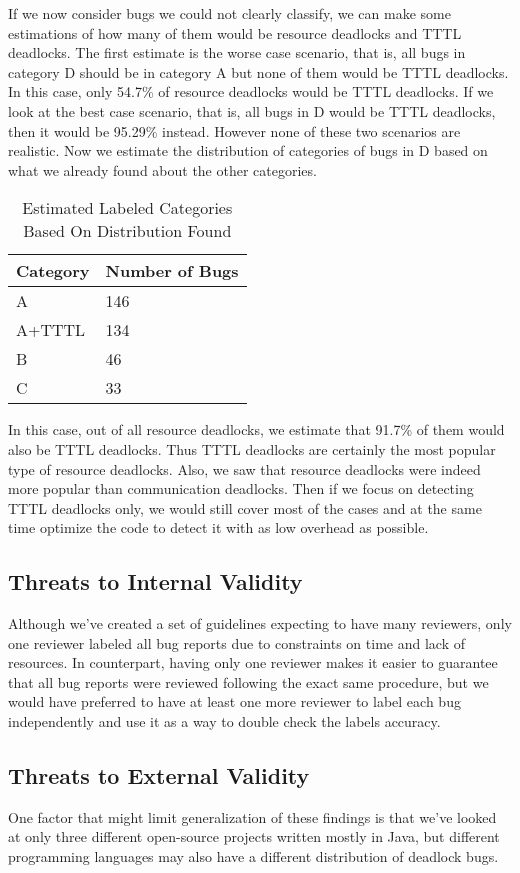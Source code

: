 If we now consider bugs we could not clearly classify, we can make some estimations of how many of them would be resource deadlocks and TTTL deadlocks.
The first estimate is the worse case scenario, that is, all bugs in category D should be in category A but none of them would be TTTL deadlocks. In this case, only 54.7\% of resource deadlocks would be TTTL deadlocks. If we look at the best case scenario, that is, all bugs in D would be TTTL deadlocks, then it would be 95.29\% instead. However none of these two scenarios are realistic. Now we estimate the distribution of categories of bugs in D based on what we already found about the other categories.

\begin{table}
\begin{center}
\caption{Estimated Labeled Categories Based On Distribution Found}
\begin{tabular}{|l|l|}
\hline
Category & Number of Bugs \\
\hline
A & 146 \\  
A+TTTL &  134 \\
B & 46 \\
C & 33 \\
\hline
\end{tabular}
\end{center}
\end{table}

In this case, out of all resource deadlocks, we estimate that 91.7\% of them would also be TTTL deadlocks. Thus TTTL deadlocks are certainly the most popular type of resource deadlocks. Also, we saw that resource deadlocks were indeed more popular than communication deadlocks. Then if we focus on detecting TTTL deadlocks only, we would still cover most of the cases and at the same time optimize the code to detect it with as low overhead as possible.

\subsection{Threats to Internal Validity}

Although we've created a set of guidelines expecting to have many reviewers, only one reviewer labeled all bug reports due to constraints on time and lack of resources.
In counterpart, having only one reviewer makes it easier to guarantee that all bug reports were reviewed following the exact same procedure, but we would have preferred to have at least one more reviewer to label each bug independently and use it as a way to double check the labels accuracy.

\subsection{Threats to External Validity}

One factor that might limit generalization of these findings is that we've looked at only three different open-source projects written mostly in Java, but different programming languages may also have a different distribution of deadlock bugs.
